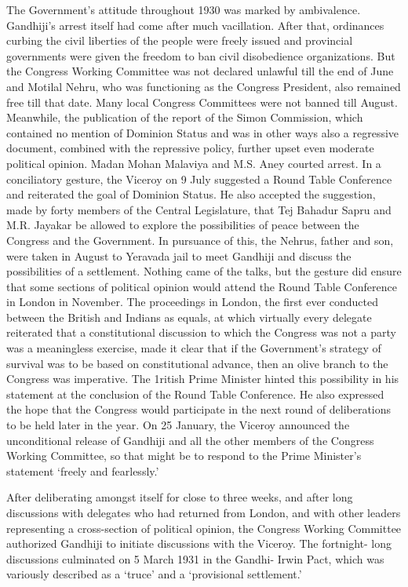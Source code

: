 \begin{multicols}{2}
The Government's attitude throughout 1930 was marked by ambivalence. Gandhiji's arrest itself had come after much vacillation. After that, ordinances curbing the civil liberties of the people were freely issued and provincial governments were given the freedom to ban civil disobedience organizations. But the Congress Working Committee was not declared unlawful till the end of June and Motilal Nehru, who was functioning as the Congress President, also remained free till that date. Many local Congress Committees were not banned till August. Meanwhile, the publication of the report of the Simon Commission, which contained no mention of Dominion Status and was in other ways also a regressive document, combined with the repressive policy, further upset even moderate political opinion. Madan Mohan Malaviya and M.S. Aney courted arrest. In a conciliatory gesture, the Viceroy on 9 July suggested a Round Table Conference and reiterated the goal of Dominion Status. He also accepted the suggestion, made by forty members of the Central Legislature, that Tej Bahadur Sapru and M.R. Jayakar be allowed to explore the possibilities of peace between the Congress and the Government. In pursuance of this, the Nehrus, father and son, were taken in August to Yeravada jail to meet Gandhiji and discuss the possibilities of a settlement. Nothing came of the talks, but the gesture did ensure that some sections of political opinion would attend the Round Table Conference in London in November. The proceedings in London, the first ever conducted between the British and Indians as equals, at which virtually every delegate reiterated that a constitutional discussion to which the Congress was not a party was a meaningless exercise, made it clear that if the Government's strategy of survival was to be based on constitutional advance, then an olive branch to the Congress was imperative. The 1ritish Prime Minister hinted this possibility in his statement at the conclusion of the Round Table Conference. He also expressed the hope that the Congress would participate in the next round of deliberations to be held later in the year. On 25 January, the Viceroy announced the unconditional release of Gandhiji and all the other members of the Congress Working Committee, so that might be to respond to the Prime Minister's statement `freely and fearlessly.'

After deliberating amongst itself for close to three weeks, and after long discussions with delegates who had returned from London, and with other leaders representing a cross-section of political opinion, the Congress Working Committee authorized Gandhiji to initiate discussions with the Viceroy. The fortnight- long discussions culminated on 5 March 1931 in the Gandhi- Irwin Pact, which was variously described as a `truce' and a `provisional settlement.'


\end{multicols}
